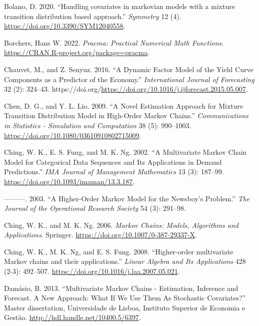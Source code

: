 \begin{CSLReferences}{1}{0}
\leavevmode{}%
Bolano, D. 2020. {``{Handling covariates in markovian models with a mixture transition distribution based approach}.''} \emph{Symmetry} 12 (4). \url{https://doi.org/10.3390/SYM12040558}.

\leavevmode{}%
Borchers, Hans W. 2022. \emph{Pracma: Practical Numerical Math Functions}. \url{https://CRAN.R-project.org/package=pracma}.

\leavevmode{}%
Chauvet, M., and Z. Senyuz. 2016. {``A Dynamic Factor Model of the Yield Curve Components as a Predictor of the Economy.''} \emph{International Journal of Forecasting} 32 (2): 324--43. https://doi.org/\url{https://doi.org/10.1016/j.ijforecast.2015.05.007}.

\leavevmode{}%
Chen, D. G., and Y. L. Lio. 2009. {``{A Novel Estimation Approach for Mixture Transition Distribution Model in High-Order Markov Chains}.''} \emph{Communications in Statistics - Simulation and Computation} 38 (5): 990--1003. \url{https://doi.org/10.1080/03610910802715009}.

\leavevmode{}%
Ching, W. K., E. S. Fung, and M. K. Ng. 2002. {``A Multivariate Markov Chain Model for Categorical Data Sequences and Its Applications in Demand Predictions.''} \emph{IMA Journal of Management Mathematics} 13 (3): 187--99. \url{https://doi.org/10.1093/imaman/13.3.187}.

\leavevmode{}%
---------. 2003. {``A Higher-Order Markov Model for the Newsboy's Problem.''} \emph{The Journal of the Operational Research Society} 54 (3): 291--98.

\leavevmode{}%
Ching, W. K., and M. K. Ng. 2006. \emph{Markov Chains: Models, Algorithms and Applications}. Springer. \url{https://doi.org/10.1007/0-387-29337-X}.

\leavevmode{}%
Ching, W. K., M. K. Ng, and E. S. Fung. 2008. {``{Higher-order multivariate Markov chains and their applications}.''} \emph{Linear Algebra and Its Applications} 428 (2-3): 492--507. \url{https://doi.org/10.1016/j.laa.2007.05.021}.

\leavevmode{}%
Damásio, B. 2013. {``{Multivariate Markov Chains - Estimation, Inference and Forecast. A New Approach: What If We Use Them As Stochastic Covariates?}''} Master dissertation, Universidade de Lisboa, Instituto Superior de Economia e Gestão. \url{http://hdl.handle.net/10400.5/6397}.


\end{CSLReferences}
